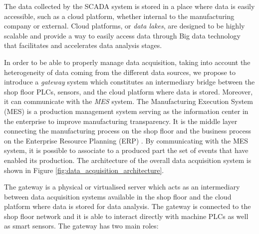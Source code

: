 The data collected by the SCADA system is stored in a place where data is easily accessible, such as a cloud platform, whether internal to the manufacturing company or external. Cloud platforms, or \textit{data lakes}, are designed to be highly scalable and provide a way to easily access data through Big data technology that facilitates and accelerates data analysis stages.  

In order to be able to properly manage data acquisition, taking into account the heterogeneity of data coming from the different data sources, we propose to introduce a \textit{gateway} system which constitutes an intermediary bridge between the shop floor PLCs, sensors, and the cloud platform where data is stored. Moreover, it can communicate with the \textit{MES} system. The Manufacturing Execution System (MES) is a production management system serving as the information center in the enterprise to improve manufacturing transparency. It is the middle layer connecting the manufacturing process on the shop floor and the business process on the Enterprise Resource Planning (ERP) \citep{chen2020implementation}. By communicating with the MES system, it is possible to associate to a produced part the set of events that have enabled its production. The architecture of the overall data acquisition system is shown in Figure \ref{fig:data_acquisition_architecture}.

The gateway is a physical or virtualised server which acts as an intermediary between data acquisition systems available in the shop floor and the cloud platform where data is stored for data analysis. The gateway is connected to the shop floor network and it is able to interact directly with machine PLCs as well as smart sensors. The gateway has two main roles:

